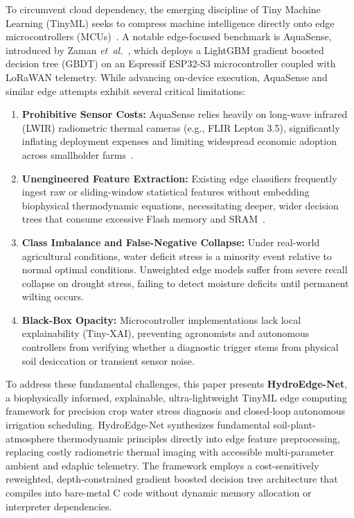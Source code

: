 To circumvent cloud dependency, the emerging discipline of Tiny Machine Learning (TinyML) seeks to compress machine intelligence directly onto edge microcontrollers (MCUs)~\cite{banbury2021benchmarking, lin2020mcunet, korostenskyi2025smart}. A notable edge-focused benchmark is AquaSense, introduced by Zaman \textit{et~al.}~\cite{zaman2026aquasense}, which deploys a LightGBM gradient boosted decision tree (GBDT) on an Espressif ESP32-S3 microcontroller coupled with LoRaWAN telemetry. While advancing on-device execution, AquaSense and similar edge attempts exhibit several critical limitations:
\begin{enumerate}
    \item \textbf{Prohibitive Sensor Costs:} AquaSense relies heavily on long-wave infrared (LWIR) radiometric thermal cameras (e.g., FLIR Lepton 3.5), significantly inflating deployment expenses and limiting widespread economic adoption across smallholder farms~\cite{nugroho2025lowcost, yang2026watermelon}.
    \item \textbf{Unengineered Feature Extraction:} Existing edge classifiers frequently ingest raw or sliding-window statistical features without embedding biophysical thermodynamic equations, necessitating deeper, wider decision trees that consume excessive Flash memory and SRAM~\cite{zaman2026aquasense}.
    \item \textbf{Class Imbalance and False-Negative Collapse:} Under real-world agricultural conditions, water deficit stress is a minority event relative to normal optimal conditions. Unweighted edge models suffer from severe recall collapse on drought stress, failing to detect moisture deficits until permanent wilting occurs.
    \item \textbf{Black-Box Opacity:} Microcontroller implementations lack local explainability (Tiny-XAI), preventing agronomists and autonomous controllers from verifying whether a diagnostic trigger stems from physical soil desiccation or transient sensor noise.
\end{enumerate}

To address these fundamental challenges, this paper presents \textbf{HydroEdge-Net}, a biophysically informed, explainable, ultra-lightweight TinyML edge computing framework for precision crop water stress diagnosis and closed-loop autonomous irrigation scheduling. HydroEdge-Net synthesizes fundamental soil-plant-atmosphere thermodynamic principles directly into edge feature preprocessing, replacing costly radiometric thermal imaging with accessible multi-parameter ambient and edaphic telemetry. The framework employs a cost-sensitively reweighted, depth-constrained gradient boosted decision tree architecture that compiles into bare-metal C code without dynamic memory allocation or interpreter dependencies.

